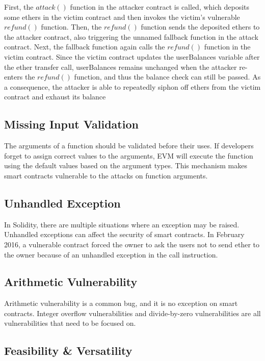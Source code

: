 \documentclass[a4paper, 10pt, conference, twocolumn]{ieeeconf}       %
\begin{document}
First, the $attack()$ function in the attacker contract is called, which deposits some ethers in the victim contract and then invokes the victim’s vulnerable $refund()$ function.
Then, the $refund()$ function sends the deposited ethers to the attacker contract, also triggering the unnamed fallback function in the attack contract.
Next, the fallback function again calls the $refund()$ function in the victim contract.
Since the victim contract updates the userBalances variable after the ether transfer call, userBalances remains unchanged when the attacker re-enters the $refund()$ function, and thus the balance check can still be passed.
As a consequence, the attacker is able to repeatedly siphon off ethers from the victim contract and exhaust its balance

\subsection{Missing Input Validation}

The arguments of a function should be validated before their uses. 
If developers forget to assign correct values to the arguments, EVM will execute the function using the default values based on the argument types.
This mechanism makes smart contracts vulnerable to the attacks on function arguments.

\subsection{Unhandled Exception}
In Solidity, there are multiple situations where an exception may be raised. Unhandled exceptions can affect the security of smart contracts. 
In February 2016, a vulnerable contract forced the owner to ask the users not to send ether to the owner because of an unhandled exception in the call instruction.

\subsection{Arithmetic Vulnerability}

Arithmetic vulnerability is a common bug, and it is no exception on smart contracts.
Integer overflow vulnerabilities and divide-by-zero vulnerabilities are all vulnerabilities that need to be focused on.

\subsection{Feasibility \& Versatility}
\end{document}
